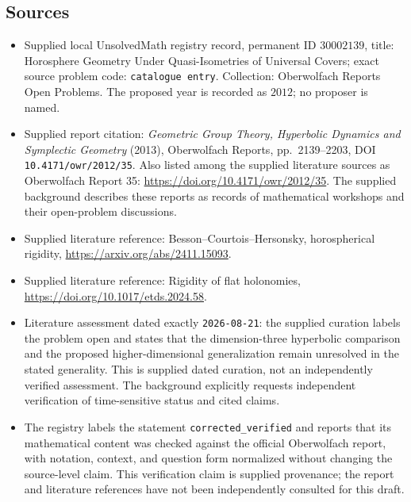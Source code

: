 \documentclass[11pt]{article}
\begin{document}
\subsection{Sources}
\begin{itemize}
\item Supplied local UnsolvedMath registry record, permanent ID \(30002139\), title: Horosphere Geometry Under Quasi-Isometries of Universal Covers; exact source problem code: \texttt{catalogue entry}. Collection: Oberwolfach Reports Open Problems. The proposed year is recorded as \(2012\); no proposer is named.
\item Supplied report citation: \emph{Geometric Group Theory, Hyperbolic Dynamics and Symplectic Geometry} (2013), Oberwolfach Reports, pp.\ 2139--2203, DOI \texttt{10.4171/owr/2012/35}. Also listed among the supplied literature sources as Oberwolfach Report 35: \url{https://doi.org/10.4171/owr/2012/35}. The supplied background describes these reports as records of mathematical workshops and their open-problem discussions.
\item Supplied literature reference: Besson--Courtois--Hersonsky, horospherical rigidity, \url{https://arxiv.org/abs/2411.15093}.
\item Supplied literature reference: Rigidity of flat holonomies, \url{https://doi.org/10.1017/etds.2024.58}.
\item Literature assessment dated exactly \texttt{2026-08-21}: the supplied curation labels the problem open and states that the dimension-three hyperbolic comparison and the proposed higher-dimensional generalization remain unresolved in the stated generality. This is supplied dated curation, not an independently verified assessment. The background explicitly requests independent verification of time-sensitive status and cited claims.
\item The registry labels the statement \texttt{corrected\_verified} and reports that its mathematical content was checked against the official Oberwolfach report, with notation, context, and question form normalized without changing the source-level claim. This verification claim is supplied provenance; the report and literature references have not been independently consulted for this draft.
\end{itemize}
\end{document}
